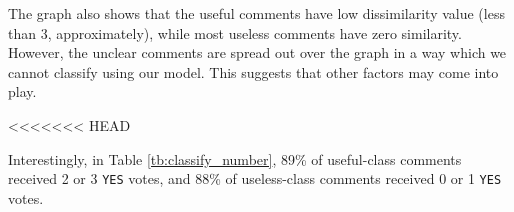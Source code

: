 The graph also shows that the useful comments have low dissimilarity value (less than 3, approximately),
while most useless comments have zero similarity.
However, the unclear comments are spread out over the graph in a way which we cannot classify using our model.
This suggests that other factors may come into play.

<<<<<<< HEAD

Interestingly, in Table \ref{tb:classify_number},
89\% of useful-class comments received 2 or 3 \texttt{YES} votes,
and 88\% of useless-class comments received 0 or 1 \texttt{YES} votes.



